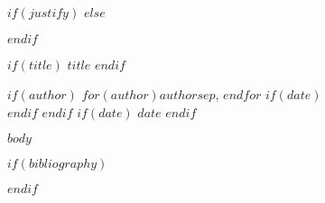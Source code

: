 \documentclass[10pt]{article}
\begin{document}
$if(justify)$
$else$
\raggedright
$endif$

$if(title)$
{\LARGE\bfseries $title$}
$endif$

$if(author)$
$for(author)$$author$$sep$, $endfor$
$if(date)$\\ $endif$
$endif$
$if(date)$
$date$
$endif$

$body$

$if(bibliography)$

$endif$
\end{document}
